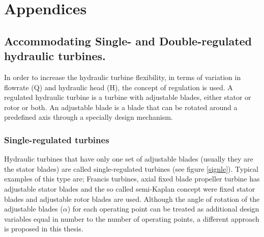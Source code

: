 

\ifpdf
    \graphicspath{{8/figures/PNG/}{8/figures/PDF/}{8/figures/}}
\else
    \graphicspath{{8/figures/EPS/}{8/figures/}}
\fi


\chapter{Appendices} %
\section{Accommodating Single- and Double-regulated hydraulic turbines.}

In order to increase the hydraulic turbine flexibility, in terms of variation in flowrate (Q) and hydraulic head (H), the concept of regulation is used. A regulated hydraulic turbine is a turbine with adjustable blades, either stator or rotor or both. An adjustable blade is a blade that can be rotated around a predefined axis through a specially design mechanism. 


\subsection{Single-regulated turbines}
\label{single.regulated}

Hydraulic turbines that have only one set of adjustable blades (usually they are the stator blades) are called single-regulated turbines (see figure \ref{signle}). Typical examples of this type are; Francis turbines, axial fixed blade propeller turbine has adjustable stator blades and the so called semi-Kaplan concept were fixed stator blades and adjustable rotor blades are used.  
Although the angle of rotation of the adjustable blades ($\alpha$) for each operating point can be treated as additional design variables equal in number to the number of operating points, a different approach is proposed in this thesis. 
                 

